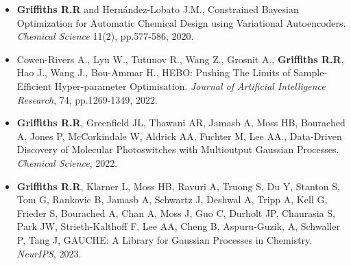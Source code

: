 \documentclass[11pt]{article}
\begin{document}
\begin{itemize}
    \item \textbf{Griffiths R.R} and Hern\'andez-Lobato J.M., Constrained Bayesian Optimization for Automatic Chemical Design using Variational Autoencoders. \textit{Chemical Science} 11(2), pp.577-586, 2020.
\end{itemize}


 
 \vspace{-7em}
\begin{itemize}
 \item Cowen-Rivers A., Lyu W., Tutunov R., Wang Z., Grosnit A., \textbf{Griffiths R.R}, Hao J., Wang J., Bou-Ammar H., HEBO: Pushing The Limits of Sample-Efficient Hyper-parameter Optimisation. \textit{Journal of Artificial Intelligence Research}, 74, pp.1269-1349, 2022.
\end{itemize}

 
 

\begin{itemize}

\item \textbf{Griffiths R.R}, Greenfield JL, Thawani AR, Jamasb A, Moss HB, Bourached A, Jones P, McCorkindale W, Aldrick AA, Fuchter M, Lee AA., Data-Driven Discovery of Molecular Photoswitches with Multioutput Gaussian Processes. \textit{Chemical Science}, 2022.

\end{itemize}

 
 
 

 \begin{itemize}

\item \textbf{Griffiths R.R}, Klarner L, Moss HB, Ravuri A, Truong S, Du Y, Stanton S, Tom G, Rankovic B, Jamasb A, Schwartz J, Deshwal A, Tripp A, Kell G, Frieder S, Bourached A, Chan A, Moss J, Guo C, Durholt JP, Chaurasia S, Park JW, Strieth-Kalthoff F, Lee AA, Cheng B, Aspuru-Guzik, A, Schwaller P, Tang J, GAUCHE: A Library for Gaussian Processes in Chemistry. \textit{NeurIPS}, 2023.

\end{itemize}
 
\end{document}

